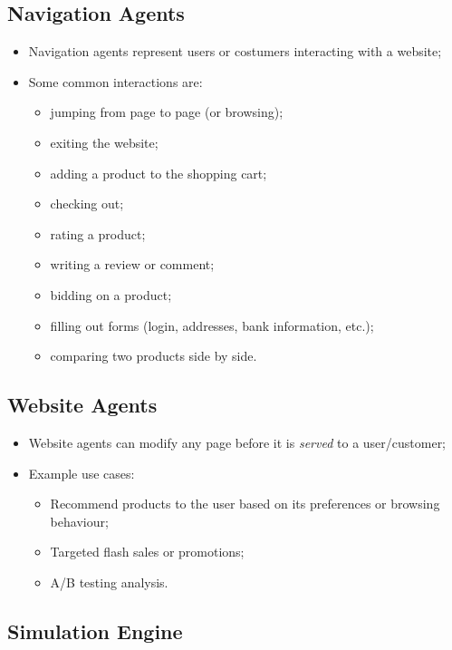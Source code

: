 \subsection{Navigation Agents}

\begin{itemize}
    \item Navigation agents represent users or costumers interacting with a 
    website;
    \item Some common interactions are:
    \begin{itemize}
        \item jumping from page to page (or browsing);
        \item exiting the website;
        \item adding a product to the shopping cart;
        \item checking out;
        \item rating a product;
        \item writing a review or comment;
        \item bidding on a product;
        \item filling out forms (login, addresses, bank information, etc.);
        \item comparing two products side by side.
    \end{itemize}
\end{itemize}

\subsection{Website Agents}

\begin{itemize}
    \item Website agents can modify any page before it is \textit{served} to a 
    user/customer;
    \item Example use cases:
    \begin{itemize}
        \item Recommend products to the user based on its preferences or 
        browsing behaviour;
        \item Targeted flash sales or promotions;
        \item A/B testing analysis.
    \end{itemize}
\end{itemize}

\subsection{Simulation Engine}

